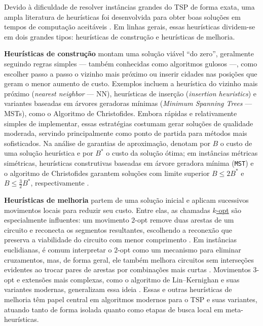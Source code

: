 Devido à dificuldade de resolver instâncias grandes do TSP de forma exata, uma ampla literatura de heurísticas foi desenvolvida para obter boas soluções em tempos de computação aceitáveis \autocite{cook2012pursuit}.
Em linhas gerais, essas heurísticas dividem-se em dois grandes tipos: heurísticas de construção e heurísticas de melhoria.

\textbf{Heurísticas de construção} montam uma solução viável ``do zero'', geralmente seguindo regras simples --- também conhecidas como algoritmos gulosos ---, como escolher passo a passo o vizinho mais próximo ou inserir cidades nas posições que geram o menor aumento de custo.
Exemplos incluem a heurística do vizinho mais próximo (\emph{nearest neighbor} --- NN), heurísticas de inserção (\emph{insertion heuristics}) e variantes baseadas em árvores geradoras mínimas (\emph{Minimum Spanning Trees} --- MSTs), como o Algoritmo de Christofides.
Embora rápidas e relativamente simples de implementar, essas estratégias costumam gerar soluções de qualidade moderada, servindo principalmente como ponto de partida para métodos mais sofisticados.
Na análise de garantias de aproximação, \textcite{simchi2005logic} denotam por \(B\) o custo de uma solução heurística e por \(B^*\) o custo da solução ótima; em instâncias métricas simétricas, heurísticas construtivas baseadas em árvore geradora mínima (\texttt{MST}) e o algoritmo de Christofides garantem soluções com limite superior \(B \le 2B^*\) e \(B \le \frac{3}{2}B^*\), respectivamente \autocite{simchi2005logic}.

\textbf{Heurísticas de melhoria} partem de uma solução inicial e aplicam sucessivos movimentos locais para reduzir seu custo.
Entre elas, as chamadas \hyperlink{term:k-opt}{\(k\)-opt} são especialmente influentes: um movimento \(2\)-opt remove duas arestas de um circuito e reconecta os segmentos resultantes, escolhendo a reconexão que preserva a viabilidade do circuito com menor comprimento \autocite{croes1958method}.
Em instâncias euclidianas, é comum interpretar o \(2\)-opt como um mecanismo para eliminar cruzamentos, mas, de forma geral, ele também melhora circuitos sem interseções evidentes ao trocar pares de arestas por combinações mais curtas \autocite{croes1958method}.
Movimentos \(3\)-opt e extensões mais complexas, como o algoritmo de Lin--Kernighan e suas variantes modernas, generalizam essa ideia \autocite{lin1973efficient,helsgaun2000effective}.
Essas e outras heurísticas de melhoria têm papel central em algoritmos modernos para o TSP e suas variantes, atuando tanto de forma isolada quanto como etapas de busca local em meta-heurísticas.

